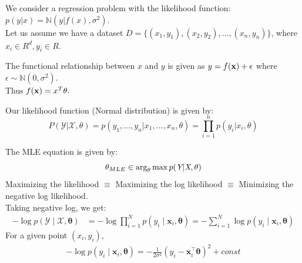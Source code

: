 \documentclass{beamer}
\begin{document}
\begin{frame}
We consider a regression problem with the likelihood function: $p(y|x) = \mathbb{N}(y|f(x), \sigma^2)$.\\
Let us assume we have a dataset $D = \{(x_1, y_1), (x_2,y_2), \ldots, (x_n, y_n)\}$, where $x_i\in R^d, y_i\in R$. 
\end{frame}

\begin{frame}
The functional relationship between $x$ and $y$ is given as $y = f(\bold{x})+\epsilon$ where $\epsilon\sim \mathbb{N}(0, \sigma^2).$ \\ 
Thus $f(\bold{x}) = x^T\theta.$\\ 
\addlinespace
{}

\end{frame}


\begin{frame}
Our likelihood function (Normal distribution) is given by:
\begin{equation}
P(\mathcal{Y}|\mathcal{X},\theta) = p(y_1,\ldots,y_n|x_1,\ldots,x_n,\theta) = \prod_{i=1}^n p(y_i|x_i, \theta) 
\end{equation}

The MLE equation is given by:
\begin{equation}
    \theta_{MLE}\in \arg_{\theta} \max p(\emph{Y}|\emph{X},\theta)
\end{equation}
Maximizing the likelihood $\equiv$ Maximizing the log likelihood $\equiv$ Minimizing the negative log likelihood.\\
Taking negative log, we get:
    \begin{align*}
        -\log p(\mathcal{Y} \mid \mathcal{X}, \boldsymbol{\theta})&=-\log \prod_{i=1}^N p\left(y_i \mid \boldsymbol{x}_i, \boldsymbol{\theta}\right)=-\sum_{i=1}^N \log p\left(y_i \mid \boldsymbol{x}_i, \boldsymbol{\theta}\right)
    \end{align*}
    For a given point $(x_i, y_i),$
    \begin{align*}
         -\log p\left(y_i \mid \boldsymbol{x}_i, \boldsymbol{\theta}\right)=-\frac{1}{2 \sigma^2}\left(y_i-\boldsymbol{x}_i^{\top} \boldsymbol{\theta}\right)^2+ const
    \end{align*}
\end{frame}
\end{document}
